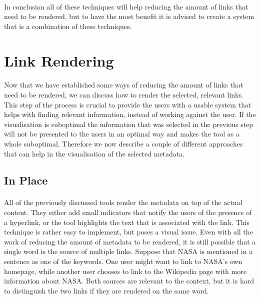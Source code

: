 		\paragraph{}
		In conclusion all of these techniques will help reducing the amount of links that need to be rendered, but to have the most benefit it is advised to create a system that is a combination of these techniques.
\section{Link Rendering} \label{sub:Link Rendering}
	\paragraph{}
	Now that we have established some ways of reducing the amount of links that need to be rendered, we can discuss how to render the selected, relevant links. This step of the process is crucial to provide the users with a usable system that helps with finding relevant information, instead of working against the user. If the visualisation is suboptimal the information that was selected in the previous step will not be presented to the users in an optimal way and makes the tool as a whole suboptimal. Therefore we now describe a couple of different approaches that can help in the visualisation of the selected metadata.
	\subsection{In Place} \label{ssub:In Place}
	\paragraph{}
	All of the previously discussed tools render the metadata on top of the actual content. They either add small indicators that notify the users of the presence of a hyperlink, or the tool highlights the text that is associated with the link. This technique is rather easy to implement, but poses a visual issue. Even with all the work of reducing the amount of metadata to be rendered, it is still possible that a single word is the source of multiple links. Suppose that NASA is mentioned in a sentence as one of the keywords. One user might want to link to NASA's own homepage, while another user chooses to link to the Wikipedia page with more information about NASA. Both sources are relevant to the context, but it is hard to distinguish the two links if they are rendered on the same word.

